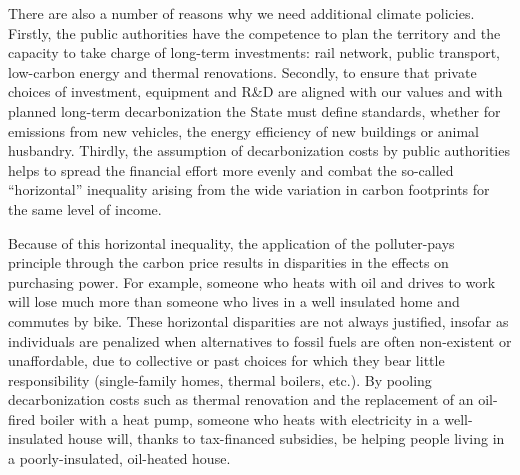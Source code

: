 \documentclass[a5paper,english,openany]{memoir}
\begin{document}
There are also a number of reasons why we need additional climate policies. %
Firstly, the public authorities have the competence to plan the territory and the capacity to take charge of long-term investments: rail network, public transport, low-carbon energy and thermal renovations. %
Secondly, to ensure that private choices of investment, equipment and R\&D %
are aligned with our values and with planned long-term decarbonization %
the State must define standards, whether for emissions from new vehicles, the energy efficiency of new buildings or animal husbandry. %
Thirdly, the assumption of decarbonization %
costs by public authorities helps to spread the financial effort more evenly and combat the so-called ``horizontal'' inequality arising from the wide variation in carbon footprints for the same level of income. %

Because of this horizontal inequality, the application of the polluter-pays principle through the carbon price results in disparities in the effects on purchasing power. For example, %
someone who heats with oil and drives to work will lose much more than someone who lives in a well insulated home and commutes by bike. 
These horizontal disparities are not always justified, insofar as individuals are penalized when alternatives to fossil fuels are often non-existent or unaffordable, due to collective or past choices for which they bear little responsibility (single-family homes, thermal boilers, etc.). By pooling decarbonization %
costs such as thermal renovation and the replacement of an oil-fired boiler with a heat pump, someone who heats with electricity in a well-insulated house will, thanks to tax-financed subsidies, be helping people living in a poorly-insulated, oil-heated house. 
\end{document}
